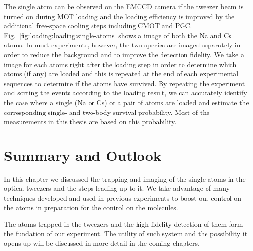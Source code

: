The single atom can be observed on the EMCCD camera if the tweezer beam
is turned on during MOT loading and the loading efficiency is improved
by the additional free-space cooling steps including CMOT and PGC.
Fig.~\ref{fig:loading:loading:single-atoms} shows a image of both the Na and Cs atoms.
In most experiments, however, the two species are imaged separately
in order to reduce the background and to improve the detection fidelity.
We take a image for each atoms right after the loading step in order to determine
which atoms (if any) are loaded and this is repeated at the end of each experimental sequences
to determine if the atoms have survived.
By repeating the experiment and sorting the events according to the loading result,
we can accurately identify the case where a single (Na or Cs) or a pair of atoms are loaded
and estimate the corresponding single- and two-body survival probability.
Most of the measurements in this thesis are based on this probability.

\section{Summary and Outlook}
\label{ch:loading:summary}

In this chapter we discussed the trapping and imaging of the single atoms in the optical
tweezers and the steps leading up to it.
We take advantage of many techniques developed and used in previous experiments
to boost our control on the atoms in preparation for the control on the molecules.

The atoms trapped in the tweezers and the high fidelity detection of them
form the fundation of our experiment.
The utility of such system and the possibility it opens up will be discussed
in more detail in the coming chapters.
